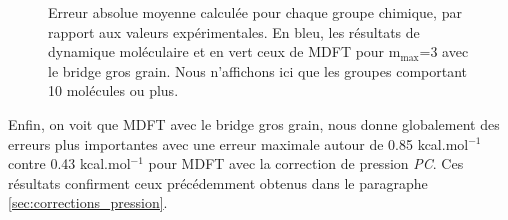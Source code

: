 \begin{figure}[H]
  \centering
  \caption{Erreur absolue moyenne calculée pour chaque groupe chimique, par rapport aux valeurs expérimentales. En bleu, les résultats de dynamique moléculaire et en vert ceux de MDFT pour $\mathrm{m}_\mathrm{max}$=3 avec le bridge gros grain. Nous n'affichons ici que les groupes comportant 10 molécules ou plus.}
  \label{fig:AUE:mmax3_cgb}
\end{figure}



Enfin, on voit que MDFT avec le bridge gros grain, nous donne globalement des erreurs plus importantes avec une erreur maximale autour de 0.85 kcal.mol$^{-1}$ contre 0.43 kcal.mol$^{-1}$ pour MDFT avec la correction de pression \textit{PC}. Ces résultats confirment ceux précédemment obtenus dans le paragraphe \ref{sec:corrections_pression}. 











